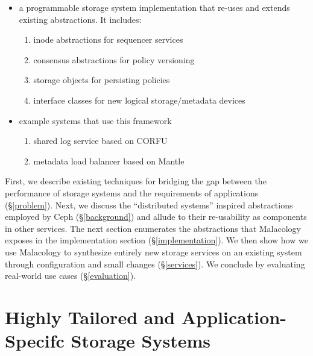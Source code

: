 \documentclass[10pt,twocolumn]{article}
\begin{document}
\begin{itemize}
\itemsep1pt\parskip0pt
\item
  a programmable storage system implementation that re-uses and extends
  existing abstractions. It includes:

  \begin{enumerate}
  \def\labelenumi{\arabic{enumi}.}
  \itemsep1pt\parskip0pt
  \item
    inode abstractions for sequencer services
  \item
    consensus abstractions for policy versioning
  \item
    storage objects for persisting policies
  \item
    interface classes for new logical storage/metadata devices
  \end{enumerate}
\item
  example systems that use this framework

  \begin{enumerate}
  \def\labelenumi{\arabic{enumi}.}
  \itemsep1pt\parskip0pt
  \item
    shared log service based on CORFU \autocite{balakrishnan_corfu_2012}
  \item
    metadata load balancer based on Mantle
    \autocite{sevilla:sc15-mantle}
  \end{enumerate}
\end{itemize}

First, we describe existing techniques for bridging the gap between the
performance of storage systems and the requirements of applications
(\S\ref{problem}). Next, we discuss the ``distributed systems'' inspired
abstractions employed by Ceph (\S\ref{background}) and allude to their
re-usability as components in other services. The next section
enumerates the abstractions that Malacology exposes in the
implementation section (\S\ref{implementation}). We then show how we use
Malacology to synthesize entirely new storage services on an existing
system through configuration and small changes (\S\ref{services}). We
conclude by evaluating real-world use cases (\S\ref{evaluation}).

\section{Highly Tailored and Application-Specifc Storage
Systems}\label{highly-tailored-and-application-specifc-storage-systems}

\label{problem}
\end{document}
